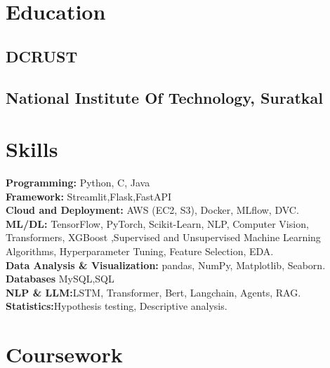\documentclass[]{deedy-resume-reversed}
\begin{document}
\hfill
\begin{minipage}[t]{0.33\textwidth}


\section{Education}
\subsection{DCRUST}
\sectionsep
\subsection{National Institute Of Technology, Suratkal}
\sectionsep


\section{Skills}  
\textbf{Programming:} Python, C, Java \\ 
\textbf{Framework:} Streamlit,Flask,FastAPI\\
\textbf{Cloud and Deployment:} AWS (EC2, S3), Docker, MLflow, DVC.\\
\textbf{ML/DL:} TensorFlow, PyTorch, Scikit-Learn, NLP, Computer Vision, Transformers, XGBoost ,Supervised and Unsupervised Machine Learning Algorithms, Hyperparameter Tuning, Feature Selection, EDA.\\  
\textbf{Data Analysis \& Visualization:} pandas, NumPy, Matplotlib, Seaborn.\\
\textbf{Databases} MySQL,SQL \\  
\textbf{NLP \& LLM:}LSTM, Transformer, Bert, Langchain, Agents, RAG.\\
\textbf{Statistics:}Hypothesis testing, Descriptive analysis.
\sectionsep


\section{Coursework}

\end{minipage}
\end{document}

